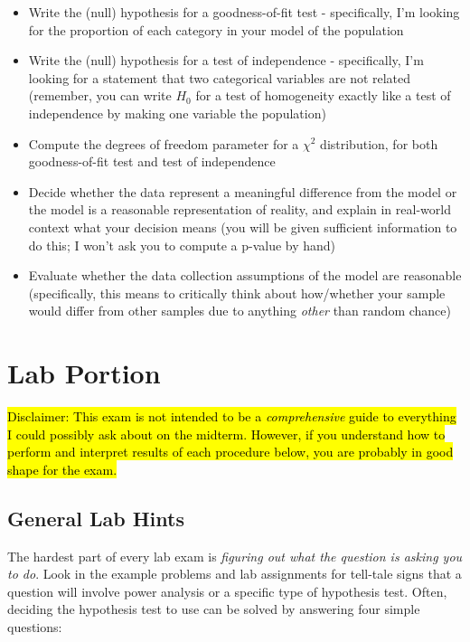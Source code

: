 \documentclass[11pt]{article} %
\begin{document}
\begin{itemize}
\item Write the (null) hypothesis for a goodness-of-fit test - specifically, I'm looking for the proportion of each category in your model of the population
\item Write the (null) hypothesis for a test of independence - specifically, I'm looking for a statement that two categorical variables are not related (remember, you can write $H_0$ for a test of homogeneity exactly like a test of independence by making one variable the population)
\item Compute the degrees of freedom parameter for a $\chi^2$ distribution, for both goodness-of-fit test and test of independence
\item Decide whether the data represent a meaningful difference from the model or the model is a reasonable representation of reality, and explain in real-world context what your decision means (you will be given sufficient information to do this; I won't ask you to compute a p-value by hand)
\item Evaluate whether the data collection assumptions of the model are reasonable (specifically, this means to critically think about how/whether your sample would differ from other samples due to anything \emph{other} than random chance)
\end{itemize} 

\newpage

\section{Lab Portion}

\hl{Disclaimer: This exam is not intended to be a \emph{comprehensive} guide to everything I could possibly ask about on the midterm. However, if you understand how to perform and interpret results of each procedure below, you are probably in good shape for the exam.}

\subsection{General Lab Hints}

The hardest part of every lab exam is \emph{figuring out what the question is asking you to do}. Look in the example problems and lab assignments  for tell-tale signs that a question will involve power analysis or a specific type of hypothesis test. Often, deciding the hypothesis test to use can be solved by answering four simple questions:
\end{document}
